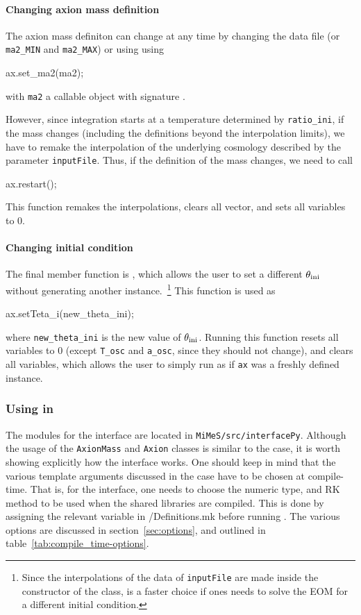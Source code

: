 \documentclass[11pt,a4paper]{article}
\begin{document}
\paragraph{Changing axion mass definition}
%
The axion mass definiton can change at any time by changing the data file (or {\tt ma2\_MIN} and {\tt ma2\_MAX}) or using using 
%
\begin{cpp}
	ax.set_ma2(ma2);
\end{cpp}
%
with {\tt ma2} a callable object with signature .

However, since integration starts at a temperature determined by {\tt ratio\_ini}, if the mass changes (including the definitions beyond the interpolation limits), we have to remake the interpolation of the underlying cosmology described by the parameter {\tt inputFile}. Thus, if the definition of the mass changes, we need to call 
%
\begin{cpp}
	ax.restart();
\end{cpp}
%
This function remakes the interpolations, clears all vector, and sets all variables to $0$. 


\paragraph{Changing initial condition}
%
The final member function is , which allows the user to set a different $\theta_{\rm ini}{}$ without generating another instance.~\footnote{Since the interpolations of the data of {\tt inputFile} are made inside the constructor of the  class,  is a faster choice if ones needs to solve the EOM for a different initial condition.} This function is used as    
%
\begin{cpp}
	ax.setTeta_i(new_theta_ini);
\end{cpp}
%
where {\tt new\_theta\_ini} is the new value of $\theta_{\rm ini}{}$. Running this function resets all variables to $0$ (except {\tt T\_osc} and {\tt a\_osc}, since they should not change), and clears all  variables, which allows the user to simply run  as if {\tt ax} was a freshly defined instance.  



\subsubsection{Using \mimes in \PY}\label{sec:begin_py}
%
The modules for the \PY interface are located in {\tt MiMeS/src/interfacePy}. Although the usage of the {\tt AxionMass} and {\tt Axion} classes is similar to the \CPP case, it is worth showing explicitly how the \PY interface works. One should keep in mind that the various template arguments discussed in the \CPP case have to be chosen at compile-time. That is, for the \PY interface, one needs to choose the numeric type, and RK method to be used when the shared libraries are compiled. This is done by assigning the relevant variable in {\mimes/Definitions.mk} before running . The various options are discussed in section~\ref{sec:options}, and outlined in table~\ref{tab:compile_time-options}.
\end{document}
